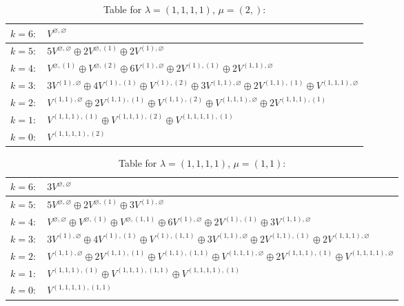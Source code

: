 \renewcommand{\arraystretch}{1.6} 
\begin{table}[H]
\centering
\caption{Table for $\lambda = (1, 1, 1, 1)$, $\mu = (2,)$:}
\begin{tabular}{|>{\centering\arraybackslash}p{15cm}|}
\hline
 $k = 6: \quad V^{\varnothing, \varnothing} $ \\ \hline
 $k = 5: \quad 5 V^{\varnothing, \varnothing} \oplus 2 V^{\varnothing, (1)} \oplus 2 V^{(1), \varnothing} $ \\ \hline
 $k = 4: \quad V^{\varnothing, (1)} \oplus V^{\varnothing, (2)} \oplus 6 V^{(1), \varnothing} \oplus 2 V^{(1), (1)} \oplus 2 V^{(1, 1), \varnothing} $ \\ \hline
 $k = 3: \quad 3 V^{(1), \varnothing} \oplus 4 V^{(1), (1)} \oplus V^{(1), (2)} \oplus 3 V^{(1, 1), \varnothing} \oplus 2 V^{(1, 1), (1)} \oplus V^{(1, 1, 1), \varnothing} $ \\ \hline
 $k = 2: \quad V^{(1, 1), \varnothing} \oplus 2 V^{(1, 1), (1)} \oplus V^{(1, 1), (2)} \oplus V^{(1, 1, 1), \varnothing} \oplus 2 V^{(1, 1, 1), (1)} $ \\ \hline
 $k = 1: \quad V^{(1, 1, 1), (1)} \oplus V^{(1, 1, 1), (2)} \oplus V^{(1, 1, 1, 1), (1)} $ \\ \hline
 $k = 0: \quad V^{(1, 1, 1, 1), (2)} $ \\ \hline
\end{tabular}
\end{table}

\renewcommand{\arraystretch}{1.6} 
\begin{table}[H]
\centering
\caption{Table for $\lambda = (1, 1, 1, 1)$, $\mu = (1, 1)$:}
\begin{tabular}{|>{\centering\arraybackslash}p{15cm}|}
\hline
 $k = 6: \quad 3 V^{\varnothing, \varnothing} $ \\ \hline
 $k = 5: \quad 5 V^{\varnothing, \varnothing} \oplus 2 V^{\varnothing, (1)} \oplus 3 V^{(1), \varnothing} $ \\ \hline
 $k = 4: \quad V^{\varnothing, \varnothing} \oplus V^{\varnothing, (1)} \oplus V^{\varnothing, (1, 1)} \oplus 6 V^{(1), \varnothing} \oplus 2 V^{(1), (1)} \oplus 3 V^{(1, 1), \varnothing} $ \\ \hline
 $k = 3: \quad 3 V^{(1), \varnothing} \oplus 4 V^{(1), (1)} \oplus V^{(1), (1, 1)} \oplus 3 V^{(1, 1), \varnothing} \oplus 2 V^{(1, 1), (1)} \oplus 2 V^{(1, 1, 1), \varnothing} $ \\ \hline
 $k = 2: \quad V^{(1, 1), \varnothing} \oplus 2 V^{(1, 1), (1)} \oplus V^{(1, 1), (1, 1)} \oplus V^{(1, 1, 1), \varnothing} \oplus 2 V^{(1, 1, 1), (1)} \oplus V^{(1, 1, 1, 1), \varnothing} $ \\ \hline
 $k = 1: \quad V^{(1, 1, 1), (1)} \oplus V^{(1, 1, 1), (1, 1)} \oplus V^{(1, 1, 1, 1), (1)} $ \\ \hline
 $k = 0: \quad V^{(1, 1, 1, 1), (1, 1)} $ \\ \hline
\end{tabular}
\end{table}

